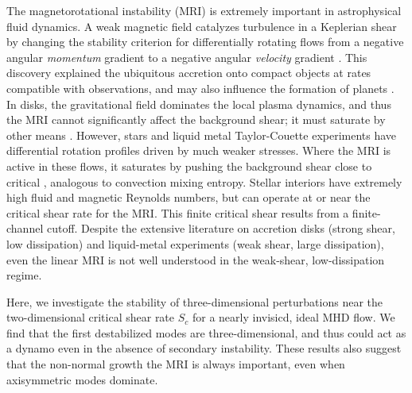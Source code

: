 \documentclass[aps,prl,reprint,superscriptaddress]{revtex4-1}
\begin{document}
\pacs{}
\maketitle

The magnetorotational instability (MRI) is extremely important in astrophysical fluid dynamics.
A weak magnetic field catalyzes turbulence in a Keplerian shear by changing the stability criterion for differentially rotating flows from a negative angular \emph{momentum} gradient to a negative angular \emph{velocity} gradient \citep[e.g.][]{1998RvMP...70....1B,2010RSPTA.368.1607J}.
This discovery explained the ubiquitous accretion onto compact objects at rates compatible with observations, and may also influence the formation of planets \citep[e.g.][]{2007Natur.448.1022J}.
In disks, the gravitational field dominates the local plasma dynamics, and thus the MRI cannot significantly affect the background shear; it must saturate by other means \citep{2018MNRAS.474.3451X}.
However, stars and liquid metal Taylor-Couette experiments have differential rotation profiles driven by much weaker stresses.
Where the MRI is active in these flows, it saturates by pushing the background shear close to critical \citep{2015RSPSA.47140699V,2017ApJ...841....1C,2017ApJ...841....2C}, analogous to convection mixing entropy.
Stellar interiors have extremely high fluid and magnetic Reynolds numbers, but can operate at or near the critical shear rate for the MRI.
This finite critical shear results from a finite-channel cutoff.
Despite the extensive literature on accretion disks (strong shear, low dissipation) and liquid-metal experiments (weak shear, large dissipation), even the linear MRI is not well understood in the weak-shear, low-dissipation regime. 

Here, we investigate the stability of three-dimensional perturbations near the two-dimensional critical shear rate $S_{c}$ for a nearly invisicd, ideal MHD flow.
We find that the first destabilized modes are three-dimensional, and thus could act as a dynamo even in the absence of secondary instability.
These results also suggest that the non-normal growth the MRI is always important, even when axisymmetric modes dominate.
\end{document}
